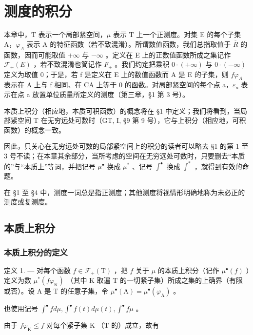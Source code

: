 \chapter{测度的积分}

本章中，T 表示一个局部紧空间，\(\mu\) 表示 T 上一个正测度。对集 E 的每个子集 A，\(\varphi_{A}\) 表示 A 的特征函数（若不致混淆）。所谓数值函数，我们总指取值于 \(\overline{R}\) 的函数，因而可能取值 \(+\infty\) 与 \(-\infty\) 。定义在 E 上的正数值函数所成之集记作 \(\mathcal{F}_{+}(E)\) ，若不致混淆也简记作 \(F_{+}\) 。我们约定把乘积 \(0 \cdot (+\infty)\) 与 \(0 \cdot (-\infty)\) 定义为取值 0；于是，若 f 是定义在 E 上的数值函数而 A 是 E 的子集，则 \(f\varphi_{A}\) 表示在 A 上与 f 相同、在 CA 上等于 0 的函数。对局部紧空间的每个点 a，\(\varepsilon_{a}\) 表示在点 a 放置单位质量所定义的测度（第三章，§1 第 3 号）。

本质上积分（相应地，本质可积函数）的概念将在 §1 中定义；我们将看到，当局部紧空间 T 在无穷远处可数时（GT, I, §9 第 9 号），它与上积分（相应地，可积函数）的概念一致。

因此，只关心在无穷远处可数的局部紧空间上的积分的读者可以略去 §1 的第 1 至 3 号不读；在本章其余部分，当所考虑的空间在无穷远处可数时，只要删去“本质的”与“本质上”等词，并把记号 \(\mu^{\bullet}\) 换成 \(\mu^{*}\) 、记号 \(\int^{\bullet}\) 换成 \(\int^{*}\) ，就得到有效的命题。

在 §1 至 §4 中，测度一词总是指正测度；其他测度将视情形明确地称为未必正的测度或复测度。

\section{本质上积分}

\subsection{本质上积分的定义}

定义 1. --- 对每个函数 \(f \in \mathcal{F}_{+}(\mathrm{T})\) ，把 \(f\) 关于 \(\mu\) 的本质上积分（记作 \(\mu^{\bullet}(f)\) ）定义为数 \(\mu^{*}(f\varphi_{\mathrm{K}})\) （其中 \(\mathrm{K}\) 取遍 \(\mathrm{T}\) 的一切紧子集）所成之集的上确界（有限或否）。设 \(\mathrm{A}\) 是 \(\mathrm{T}\) 的任意子集，令 \(\mu^{\bullet}(\mathrm{A}) = \mu^{\bullet}(\varphi_{\mathrm{A}})\) 。

也使用记号 \(\int^{\bullet}f d\mu ,\int^{\bullet}f(t)d\mu (t),\int^{\bullet}f\mu\) 。

由于 \(f\varphi_{\mathrm{K}} \leqslant f\) 对每个紧子集 \(\mathrm{K}\) （\(\mathrm{T}\) 的）成立，故有

